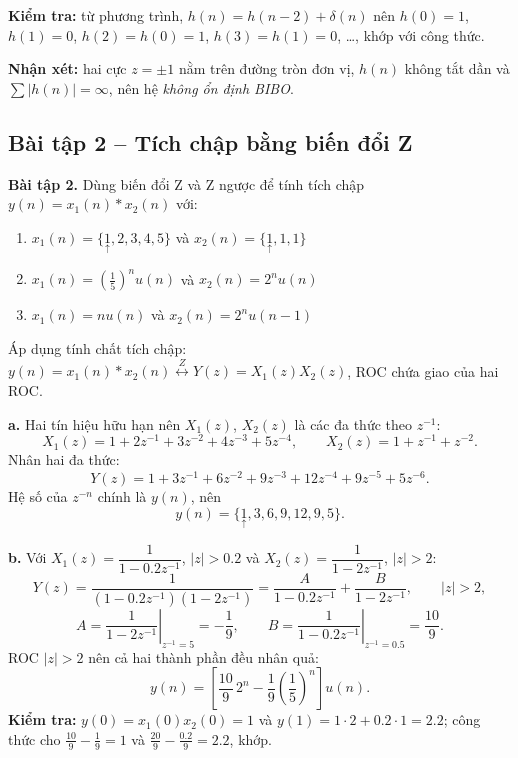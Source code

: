 \documentclass[12pt,a4paper]{article}
\newcommand{\org}[1]{\underset{\uparrow}{#1}}
\newcommand{\zpair}{\overset{Z}{\longleftrightarrow}}
\begin{document}
\textbf{Kiểm tra:} từ phương trình, $h(n) = h(n-2) + \delta(n)$ nên $h(0) = 1$, $h(1) = 0$, $h(2) = h(0) = 1$, $h(3) = h(1) = 0$, \dots, khớp với công thức.

\textbf{Nhận xét:} hai cực $z = \pm 1$ nằm trên đường tròn đơn vị, $h(n)$ không tắt dần và $\sum |h(n)| = \infty$, nên hệ \emph{không ổn định BIBO}.

\subsection{Bài tập 2 -- Tích chập bằng biến đổi Z}
\begin{mdframed}[style=exbox]
\noindent\textbf{Bài tập 2.} Dùng biến đổi Z và Z ngược để tính tích chập $y(n) = x_1(n) * x_2(n)$ với:
\begin{enumerate}
    \item[a.] $x_1(n) = \{\org{1}, 2, 3, 4, 5\}$ và $x_2(n) = \{\org{1}, 1, 1\}$
    \item[b.] $x_1(n) = \left(\frac{1}{5}\right)^n u(n)$ và $x_2(n) = 2^n u(n)$
    \item[c.] $x_1(n) = n u(n)$ và $x_2(n) = 2^n u(n-1)$
\end{enumerate}
\end{mdframed}

Áp dụng tính chất tích chập: $y(n) = x_1(n) * x_2(n) \zpair Y(z) = X_1(z) X_2(z)$, ROC chứa giao của hai ROC.

\textbf{a.} Hai tín hiệu hữu hạn nên $X_1(z)$, $X_2(z)$ là các đa thức theo $z^{-1}$:
\[
    X_1(z) = 1 + 2z^{-1} + 3z^{-2} + 4z^{-3} + 5z^{-4},
    \qquad
    X_2(z) = 1 + z^{-1} + z^{-2}.
\]
Nhân hai đa thức:
\[
    Y(z) = 1 + 3z^{-1} + 6z^{-2} + 9z^{-3} + 12z^{-4} + 9z^{-5} + 5z^{-6}.
\]
Hệ số của $z^{-n}$ chính là $y(n)$, nên
\begin{equation}
    y(n) = \{\org{1}, 3, 6, 9, 12, 9, 5\}.
\end{equation}

\textbf{b.} Với $X_1(z) = \dfrac{1}{1 - 0.2 z^{-1}}$, $|z| > 0.2$ và $X_2(z) = \dfrac{1}{1 - 2 z^{-1}}$, $|z| > 2$:
\[
    Y(z) = \frac{1}{(1 - 0.2 z^{-1})(1 - 2 z^{-1})} = \frac{A}{1 - 0.2 z^{-1}} + \frac{B}{1 - 2 z^{-1}}, \qquad |z| > 2,
\]
\[
    A = \left.\frac{1}{1 - 2 z^{-1}}\right|_{z^{-1} = 5} = -\frac{1}{9},
    \qquad
    B = \left.\frac{1}{1 - 0.2 z^{-1}}\right|_{z^{-1} = 0.5} = \frac{10}{9}.
\]
ROC $|z| > 2$ nên cả hai thành phần đều nhân quả:
\begin{equation}
    y(n) = \left[\frac{10}{9}\, 2^n - \frac{1}{9} \left(\frac{1}{5}\right)^n\right] u(n).
\end{equation}
\textbf{Kiểm tra:} $y(0) = x_1(0)x_2(0) = 1$ và $y(1) = 1 \cdot 2 + 0.2 \cdot 1 = 2.2$; công thức cho $\frac{10}{9} - \frac{1}{9} = 1$ và $\frac{20}{9} - \frac{0.2}{9} = 2.2$, khớp.
\end{document}
